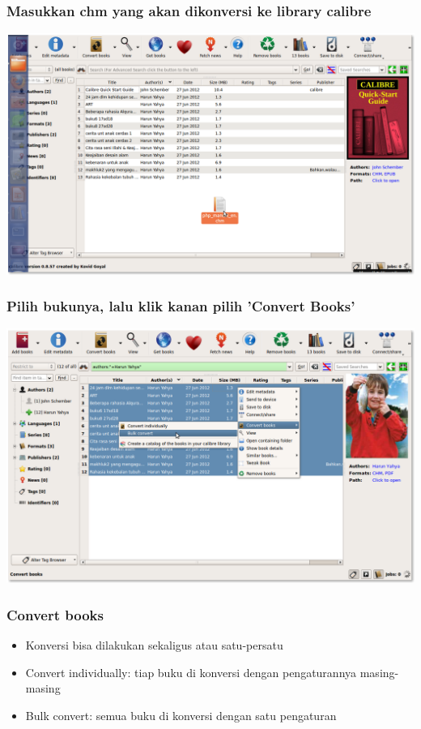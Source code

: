 \documentclass[11pt]{beamer}
\begin{document}
\begin{frame}[shrink=20]
\frametitle{Masukkan chm yang akan dikonversi ke library calibre}
\includegraphics[width=\paperwidth]{graphic/insert_chm.png}
\end{frame}


\begin{frame}[shrink=20]
\frametitle{Pilih bukunya, lalu klik kanan pilih 'Convert Books'}
\includegraphics[width=\paperwidth]{graphic/convert_books.png}
\end{frame}

\begin{frame}
\frametitle{Convert books}
\begin{itemize}
\item Konversi bisa dilakukan sekaligus atau satu-persatu
\item Convert individually: tiap buku di konversi dengan pengaturannya masing-masing
\item Bulk convert: semua buku di konversi dengan satu pengaturan
\end{itemize}
\end{frame}
\end{document}

